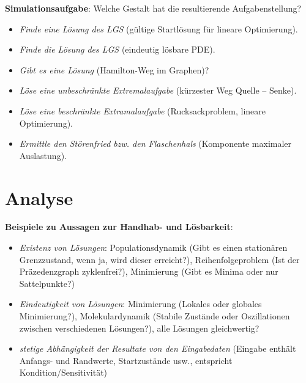 \textbf{Simulationsaufgabe}:
Welche Gestalt hat die resultierende Aufgabenstellung?
\begin{itemize}
    \item
    \emph{Finde eine Lösung des LGS}
    (gültige Startlösung für lineare Optimierung).

    \item
    \emph{Finde die Lösung des LGS}
    (eindeutig lösbare PDE).

    \item
    \emph{Gibt es eine Lösung}
    (Hamilton-Weg im Graphen)?

    \item
    \emph{Löse eine unbeschränkte Extremalaufgabe}
    (kürzester Weg Quelle -- Senke).

    \item
    \emph{Löse eine beschränkte Extramalaufgabe}
    (Rucksackproblem, lineare Optimierung).

    \item
    \emph{Ermittle den Störenfried bzw. den Flaschenhals}
    (Komponente maximaler Auslastung).
\end{itemize}

\pagebreak

\section{%
    Analyse%
}

\textbf{Beispiele zu Aussagen zur Handhab- und Lösbarkeit}:
\begin{itemize}
    \item
    \emph{Existenz von Lösungen}:
    Populationsdynamik (Gibt es einen stationären Grenzzustand, wenn ja, wird dieser erreicht?),
    Reihenfolgeproblem (Ist der Präzedenzgraph zyklenfrei?),
    Minimierung (Gibt es Minima oder nur Sattelpunkte?)

    \item
    \emph{Eindeutigkeit von Lösungen}:
    Minimierung (Lokales oder globales Minimierung?),
    Molekulardynamik (Stabile Zustände oder Oszillationen zwischen verschiedenen Lösungen?),
    alle Lösungen gleichwertig?

    \item
    \emph{stetige Abhängigkeit der Resultate von den Eingabedaten}
    (Eingabe enthält Anfangs- und Randwerte, Startzustände usw.,
    entspricht Kondition/Sensitivität)
\end{itemize}

\linie

